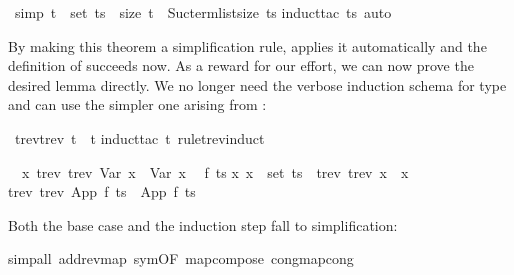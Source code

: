 %
\begin{isabellebody}%
\def\isabellecontext{Nested{\isadigit{2}}}%
\isanewline
\isamarkupfalse%
\ {\isacharbrackleft}simp{\isacharbrackright}{\isacharcolon}\ {\isachardoublequote}t\ {\isasymin}\ set\ ts\ {\isasymlongrightarrow}\ size\ t\ {\isacharless}\ Suc{\isacharparenleft}term{\isacharunderscore}list{\isacharunderscore}size\ ts{\isacharparenright}{\isachardoublequote}\isanewline
\isamarkupfalse%
induct{\isacharunderscore}tac\ ts{\isacharcomma}\ auto{\isacharparenright}\isamarkupfalse%
\isamarkupfalse%
%
\begin{isamarkuptext}%
\noindent
By making this theorem a simplification rule, 
applies it automatically and the definition of 
succeeds now. As a reward for our effort, we can now prove the desired
lemma directly.  We no longer need the verbose
induction schema for type  and can use the simpler one arising from
:%
\end{isamarkuptext}%
\isamarkuptrue%
\ {\isachardoublequote}trev{\isacharparenleft}trev\ t{\isacharparenright}\ {\isacharequal}\ t{\isachardoublequote}\isanewline
\isamarkupfalse%
induct{\isacharunderscore}tac\ t\ rule{\isacharcolon}trev{\isachardot}induct{\isacharparenright}\isamarkupfalse%
%
\begin{isamarkuptxt}%
\begin{isabelle}%
\ {}{\isachardot}\ {\isasymAnd}x{\isachardot}\ trev\ {\isacharparenleft}trev\ {\isacharparenleft}Var\ x{\isacharparenright}{\isacharparenright}\ {\isacharequal}\ Var\ x\isanewline
\ {}{\isachardot}\ {\isasymAnd}f\ ts{\isachardot}\isanewline
{}x{\isachardot}\ x\ {\isasymin}\ set\ ts\ {\isasymlongrightarrow}\ trev\ {\isacharparenleft}trev\ x{\isacharparenright}\ {\isacharequal}\ x\ {\isasymLongrightarrow}\isanewline
{}trev\ {\isacharparenleft}trev\ {\isacharparenleft}App\ f\ ts{\isacharparenright}{\isacharparenright}\ {\isacharequal}\ App\ f\ ts%
\end{isabelle}
Both the base case and the induction step fall to simplification:%
\end{isamarkuptxt}%
\isamarkuptrue%
simp{\isacharunderscore}all\ add{\isacharcolon}rev{\isacharunderscore}map\ sym{\isacharbrackleft}OF\ map{\isacharunderscore}compose{\isacharbrackright}\ cong{\isacharcolon}map{\isacharunderscore}cong{\isacharparenright}\isamarkupfalse%

\end{isabellebody}
